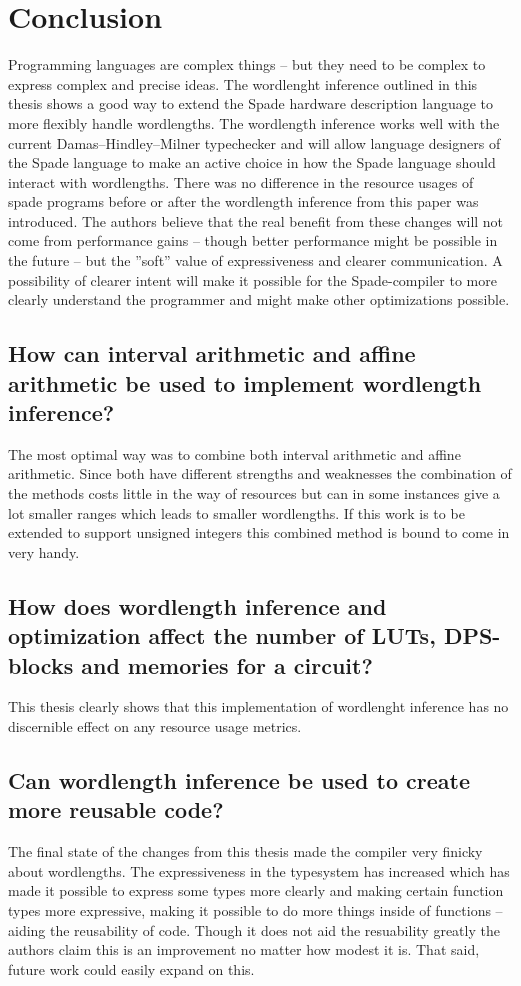 \chapter{Conclusion}
\label{cha:Conclusion}
Programming languages are complex things -- but they need to be complex to express complex and precise ideas. The wordlenght inference outlined in this thesis shows a good way to extend the Spade hardware description language to more flexibly handle wordlengths. The wordlength inference works well with the current Damas–Hindley–Milner typechecker and will allow language designers of the Spade language to make an active choice in how the Spade language should interact with wordlengths. There was no difference in the resource usages of spade programs before or after the wordlength inference from this paper was introduced. The authors believe that the real benefit from these changes will not come from performance gains -- though better performance might be possible in the future -- but the ''soft'' value of expressiveness and clearer communication. A possibility of clearer intent will make it possible for the Spade-compiler to more clearly understand the programmer and might make other optimizations possible.


\section{How can interval arithmetic and affine arithmetic be used to implement wordlength inference?}
The most optimal way was to combine both interval arithmetic and affine arithmetic. Since both have different strengths and weaknesses the combination of the methods costs little in the way of resources but can in some instances give a lot smaller ranges which leads to smaller wordlengths. If this work is to be extended to support unsigned integers this combined method is bound to come in very handy. 

\section{How does wordlength inference and optimization affect the number of LUTs, DPS-blocks and memories for a circuit?}
This thesis clearly shows that this implementation of wordlenght inference has no discernible effect on any resource usage metrics.

\section{Can wordlength inference be used to create more reusable code?}
The final state of the changes from this thesis made the compiler very finicky about wordlengths. The expressiveness in the typesystem has increased which has made it possible to express some types more clearly and making certain function types more expressive, making it possible to do more things inside of functions -- aiding the reusability of code. Though it does not aid the resuability greatly the authors claim this is an improvement no matter how modest it is. That said, future work could easily expand on this.


